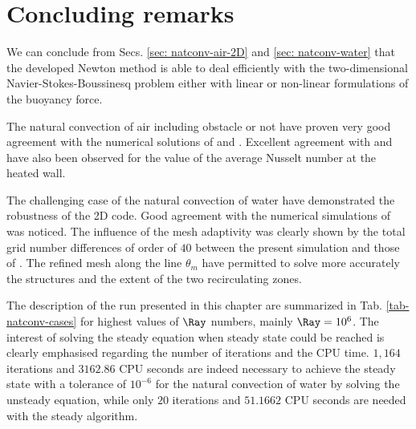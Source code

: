 \newpage
\section{Concluding remarks}

We can conclude from Secs. \ref{sec: natconv-air-2D} and \ref{sec: natconv-water} that the developed Newton method is able to deal  efficiently with the two-dimensional Navier-Stokes-Boussinesq problem either with linear or non-linear formulations of the buoyancy force.

\noindent The natural convection of air including obstacle or not have proven very good agreement with the numerical solutions of \cite{LeQuere91} and \cite{Raluca2013}.
Excellent agreement with \cite{de1983natural} and \cite{LeQuere91} have also been observed for the value of the average Nusselt number at the heated wall. 

\noindent The challenging case of the natural convection of water have demonstrated the robustness of the 2D code. 
Good agreement with the numerical simulations of \cite{Kowalewski-2003} was noticed. 
The influence of the mesh adaptivity was clearly shown by the total grid number differences of order of $40$ between the present simulation and those of \cite{Kowalewski-2003} .
The refined mesh along the line $\theta_m$ have permitted to solve more accurately the structures and the extent of the two recirculating zones.

The description of the run presented in this chapter are summarized in Tab. \ref{tab-natconv-cases} for highest values of $\Ray$ numbers, mainly $\Ray = 10^6$.
The interest of solving the steady equation when steady state could be reached is clearly emphasised regarding the number of iterations and the CPU time.
$1,164$ iterations and $3162.86$ CPU seconds are indeed necessary to achieve the steady state with a tolerance of $10^{-6}$ for the natural convection of water by solving the unsteady equation,
while only $20$ iterations and $51.1662$ CPU seconds are needed with the steady algorithm.

